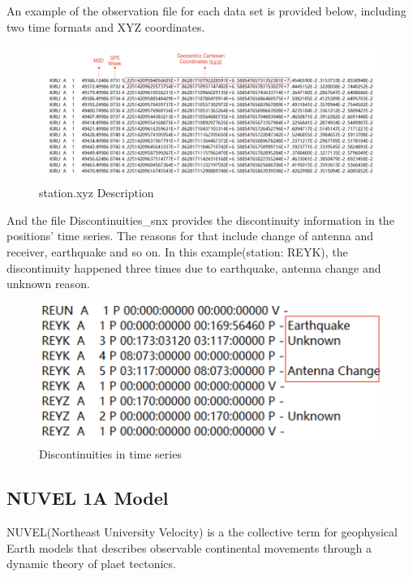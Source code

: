 \documentclass{article}
\begin{document}
An example of the observation file for each data set is provided below, including two time formats and XYZ coordinates.
\begin{figure}[htbp]
    \centering
    \includegraphics[width=12cm]{./source/xyz.png}
    \caption{station.xyz Description}
    \label{fig:XYZ_obs}
\end{figure}

And the file Discontinuities\_snx provides the discontinuity information in the positions' time series. The reasons for that include change of antenna and receiver, earthquake and so on.
In this example(station: REYK), the discontinuity happened three times due to earthquake, antenna change and unknown reason.
\begin{figure}[htbp]
  \centering
  \includegraphics[width=12cm]{../source/dis.png}
  \caption{Discontinuities in time series}
  \label{fig:Dis_snx}
\end{figure}

\subsection{NUVEL 1A Model}
NUVEL(Northeast University Velocity) is a the collective term for geophysical Earth models that describes observable
continental movements through a dynamic theory of plaet tectonics.
\end{document}
